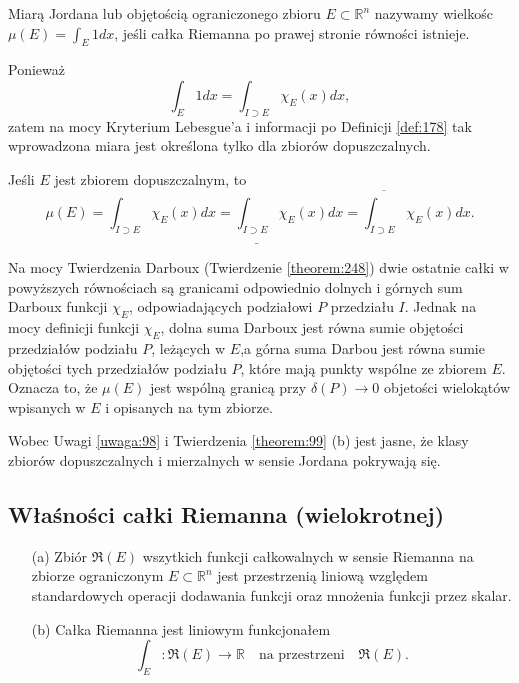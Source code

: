 \documentclass[leqno]{article}
\begin{document}
\begin{justify}
\begin{defn}
    Miarą Jordana lub objętością ograniczonego zbioru $E \subset \mathbb{R}^n$ nazywamy wielkośc $\mu(E) = \int_{E}1dx$, jeśli 
    całka Riemanna po prawej stronie równości istnieje.

    Ponieważ 
    \[
        \int_{E}1dx = \int_{I \supset E}\chi_E(x)dx,
    \]
    zatem na mocy Kryterium Lebesgue'a i informacji po Definicji \ref{def:178} tak wprowadzona miara jest określona tylko dla zbiorów dopuszczalnych.
\end{defn}

\begin{uwaga}
    Jeśli $E$ jest zbiorem dopuszczalnym, to 
    \[
        \mu(E) = \int_{I \supset E}\chi_E(x)dx = \underline{\int_{I \supset E}}\chi_E(x)dx = \overline{\int_{I \supset E}}\chi_E(x)dx.
    \]
\end{uwaga}

Na mocy Twierdzenia Darboux (Twierdzenie \ref{theorem:248}) dwie ostatnie całki w powyższych równościach są granicami odpowiednio
dolnych i górnych sum Darboux funkcji $\chi_E$, odpowiadających podziałowi $P$ przedziału $I$. Jednak na mocy definicji funkcji $\chi_E$, dolna suma Darboux 
jest równa sumie objętości przedziałów podziału $P$, leżących w $E$,a górna suma Darbou jest równa sumie objętości tych przedziałów podziału $P$, które mają 
punkty wspólne ze zbiorem $E$. Oznacza to, że $\mu(E)$ jest wspólną granicą przy $\delta(P) \to 0$ objetości wielokątów wpisanych w $E$ i opisanych na tym zbiorze.

Wobec Uwagi \ref{uwaga:98} i Twierdzenia \ref{theorem:99} (b) jest jasne, że klasy zbiorów dopuszczalnych i mierzalnych w sensie Jordana pokrywają się.

\subsection{Właśności całki Riemanna (wielokrotnej)}

\begin{theorem}
{
    \begin{itemize}
        \item [(a)]
            Zbiór $\mathfrak{R}(E)$ wszytkich funkcji całkowalnych w sensie Riemanna na zbiorze ograniczonym $E \subset \mathbb{R}^n$ jest przestrzenią liniową względem
            standardowych operacji dodawania funkcji oraz mnożenia funkcji przez skalar.
        \item [(b)]
            Całka Riemanna jest liniowym funkcjonałem 
            \[
                \int_{E} : \mathfrak{R}(E) \to \mathbb{R} \quad \text{na przestrzeni} \quad \mathfrak{R}(E).
            \]
    \end{itemize}
}
\end{theorem}


\end{justify}
\end{document}
